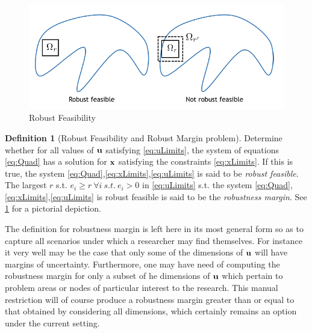 \documentclass[11pt]{article}
\theoremstyle{plain}
\theoremstyle{definition}
\newtheorem{cdef}{Definition}[section]
\theoremstyle{remark}
\begin{document}
\begin{figure}
\begin{center}
\includegraphics[scale=0.5]{Figures/Rfeas}
\end{center}
\caption{Robust Feasibility}
\label{fig:RFeas}
\end{figure}

\begin{cdef}[Robust Feasibility and Robust Margin problem]
\label{RobustDef}
Determine whether for all values of $\bold u$ satisfying \eqref{eq:uLimits}, the system of equations \eqref{eq:Quad} has a solution for $\bold x$ satisfying the constraints \eqref{eq:xLimits}. 
If this is true, the system \eqref{eq:Quad},\eqref{eq:xLimits},\eqref{eq:uLimits} is said to be \emph{robust feasible}. 
The largest $r$ s.t. $e_i\geq r \ \forall i \ s.t. \ e_i>0$ in \eqref{eq:uLimits} s.t. the system \eqref{eq:Quad},\eqref{eq:xLimits},\eqref{eq:uLimits} is robust feasible is said to be the \emph{robustness margin}. 
See \cref{fig:RFeas} for a pictorial depiction. 
\end{cdef}

The definition for robustness margin is left here in its most general form so as to capture all scenarios under which a researcher may find themselves. 
For instance it very well may be the case that only some of the dimensions of $\bold u$ will have margins of uncertainty. 
Furthermore, one may have need of computing the robustness margin for only a subset of he dimensions of $\bold u$ which pertain to problem areas or nodes of particular interest to the research. 
This manual restriction will of course produce a robustness margin greater than or equal to that obtained by considering all dimensions, which certainly remains an option under the current setting. 
\end{document}
